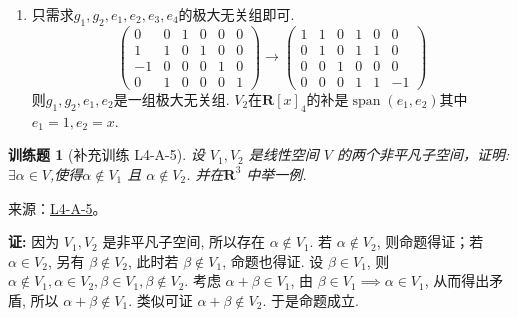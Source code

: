 \documentclass[UTF8,12pt,a4paper,fontset=fandol]{ctexart}
\newtheorem{exercise}{训练题}[section]
\begin{document}
\begin{solve}
\begin{enumerate}
                \item 只需求$g_1,g_2,e_1,e_2,e_3,e_4$的极大无关组即可.
                      \[\begin{pmatrix}
                              0  & 0 & 1 & 0 & 0 & 0 \\
                              1  & 1 & 0 & 1 & 0 & 0 \\
                              -1 & 0 & 0 & 0 & 1 & 0 \\
                              0  & 1 & 0 & 0 & 0 & 1\end{pmatrix}\rightarrow
                          \begin{pmatrix}
                              1 & 1 & 0 & 1 & 0 & 0  \\
                              0 & 1 & 0 & 1 & 1 & 0  \\
                              0 & 0 & 1 & 0 & 0 & 0  \\
                              0 & 0 & 0 & 1 & 1 & -1\end{pmatrix}\]
                      则$g_1,g_2,e_1,e_2$是一组极大无关组. $V_2$在$\mathbf{R}[x]_4$的补是$\operatorname{span}(e_1,e_2)$其中$e_1=1,e_2=x$.
            \end{enumerate}
\end{solve}

\begin{exercise}[补充训练 L4-A-5]\label{prob:L4-A-5}
设 $V_1,V_2$ 是线性空间 $V$ 的两个非平凡子空间，证明: $\exists \alpha \in V$,使得$\alpha \notin V_1$ 且 $\alpha \notin V_2$. 并在$\mathbf{R}^3$ 中举一例.
\end{exercise}
\noindent 来源：\href{https://github.com/yhwu-is/Linear-Algebra-Left-Undone/blob/new/%E8%AE%B2%E4%B9%89/%E4%B8%93%E9%A2%98/4%20%E7%BA%BF%E6%80%A7%E7%A9%BA%E9%97%B4%E7%9A%84%E8%BF%90%E7%AE%97.tex}{L4-A-5}。
\begin{solve}
\textbf{证:} 因为 $V_1, V_2$ 是非平凡子空间, 所以存在 $\alpha \notin V_1$. 若 $\alpha \notin V_2$, 则命题得证；若 $\alpha \in V_2$, 另有 $\beta \notin V_2$, 此时若 $\beta \notin V_1$, 命题也得证. 设 $\beta \in V_1$, 则 $\alpha \notin V_1, \alpha \in V_2, \beta \in V_1, \beta \notin V_2$.
            考虑 $\alpha + \beta \in V_1$, 由 $\beta \in V_1 \implies \alpha \in V_1$, 从而得出矛盾, 所以 $\alpha + \beta \notin V_1$. 类似可证 $\alpha + \beta \notin V_2$. 于是命题成立.
\end{solve}
\end{document}
